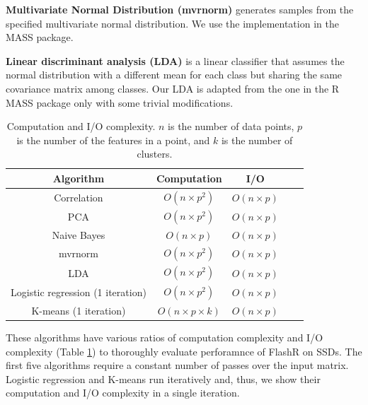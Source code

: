 \noindent \textbf{Multivariate Normal Distribution (mvrnorm)} generates
samples from the specified multivariate normal distribution. We use
the implementation in the MASS package.

\noindent \textbf{Linear discriminant analysis (LDA)} is a linear classifier
that assumes the normal distribution with a different mean for each class
but sharing the same covariance matrix among classes. Our LDA is adapted from
the one in the R MASS package only with some trivial modifications.

\begin{table}
\begin{center}
\footnotesize
\begin{tabular}{|c|c|c|c|c|}
\hline
Algorithm & Computation & I/O \\
\hline
Correlation & $O(n \times p^2)$ & $O(n \times p)$ \\
\hline
PCA & $O(n \times p^2)$ & $O(n \times p)$ \\
\hline
Naive Bayes & $O(n \times p)$ & $O(n \times p)$ \\
\hline
mvrnorm & $O(n \times p^2)$ & $O(n \times p)$ \\
\hline
LDA & $O(n \times p^2)$ & $O(n \times p)$ \\
\hline
Logistic regression  (1 iteration) & $O(n \times p^2)$ & $O(n \times p)$ \\
\hline
K-means (1 iteration) & $O(n \times p \times k)$ & $O(n \times p)$ \\
\hline
\end{tabular}
\normalsize
\end{center}
\caption{Computation and I/O complexity. $n$ is the number of data points, $p$
is the number of the features in a point, and $k$ is the number of clusters.
	}
\label{tbl:algs}
\end{table}

These algorithms have various ratios of computation complexity and I/O complexity
(Table \ref{tbl:algs}) to thoroughly evaluate perforamnce of FlashR on SSDs.
The first five algorithms require a constant number of passes over the input
matrix. Logistic regression and K-means run iteratively and, thus, we show
their computation and I/O complexity in a single iteration.

